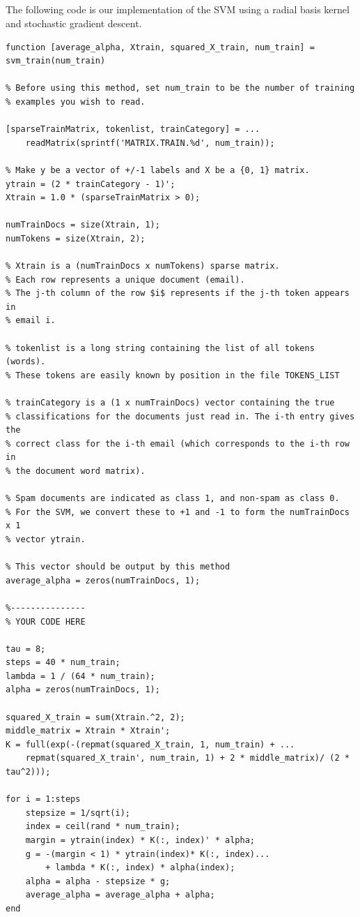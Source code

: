 \documentclass[11pt,a4paper,titlepage]{article}
\begin{document}
{\subsection{}{
\quad The following code is our implementation of the SVM using a radial basis kernel and stochastic gradient descent.
\begin{verbatim}
function [average_alpha, Xtrain, squared_X_train, num_train] = svm_train(num_train)

% Before using this method, set num_train to be the number of training
% examples you wish to read.

[sparseTrainMatrix, tokenlist, trainCategory] = ...
    readMatrix(sprintf('MATRIX.TRAIN.%d', num_train));

% Make y be a vector of +/-1 labels and X be a {0, 1} matrix.
ytrain = (2 * trainCategory - 1)';
Xtrain = 1.0 * (sparseTrainMatrix > 0);

numTrainDocs = size(Xtrain, 1);
numTokens = size(Xtrain, 2);

% Xtrain is a (numTrainDocs x numTokens) sparse matrix.
% Each row represents a unique document (email).
% The j-th column of the row $i$ represents if the j-th token appears in
% email i.

% tokenlist is a long string containing the list of all tokens (words).
% These tokens are easily known by position in the file TOKENS_LIST

% trainCategory is a (1 x numTrainDocs) vector containing the true 
% classifications for the documents just read in. The i-th entry gives the 
% correct class for the i-th email (which corresponds to the i-th row in 
% the document word matrix).

% Spam documents are indicated as class 1, and non-spam as class 0.
% For the SVM, we convert these to +1 and -1 to form the numTrainDocs x 1
% vector ytrain.

% This vector should be output by this method
average_alpha = zeros(numTrainDocs, 1);

%---------------
% YOUR CODE HERE

tau = 8;
steps = 40 * num_train;
lambda = 1 / (64 * num_train);
alpha = zeros(numTrainDocs, 1);

squared_X_train = sum(Xtrain.^2, 2);
middle_matrix = Xtrain * Xtrain';
K = full(exp(-(repmat(squared_X_train, 1, num_train) + ...
    repmat(squared_X_train', num_train, 1) + 2 * middle_matrix)/ (2 * tau^2)));

for i = 1:steps
    stepsize = 1/sqrt(i);
    index = ceil(rand * num_train);
    margin = ytrain(index) * K(:, index)' * alpha;
    g = -(margin < 1) * ytrain(index)* K(:, index)...
        + lambda * K(:, index) * alpha(index);
    alpha = alpha - stepsize * g;
    average_alpha = average_alpha + alpha;
end


\end{verbatim}}}
\end{document}
